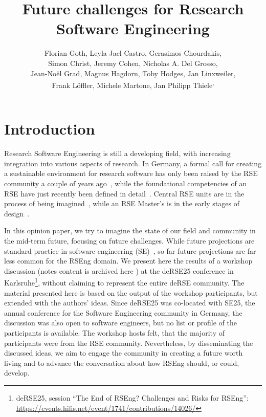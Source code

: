 \documentclass{eceasst}
\title{Future challenges for Research Software Engineering} %
\author{
Florian Goth\authorOrcid{0000-0003-2707-4790}\authorRef{1},
Leyla Jael Castro\authorOrcid{0000-0003-3986-0510}\authorRef{2},
Gerasimos Chourdakis\authorOrcid{0000-0002-3977-1385}\authorRef{3},
\texorpdfstring{\\}{} %
Simon Christ\authorOrcid{0000-0002-5866-1472}\authorRef{4},
Jeremy Cohen\authorOrcid{0000-0003-4312-2537}\authorRef{5},
Nicholas A. Del Grosso\thinspace\authorRef{6},
\texorpdfstring{\\}{} %
Jean-Noël Grad\authorOrcid{0000-0002-5821-4912}\authorRef{7},
Magnus Hagdorn\authorOrcid{0000-0002-5076-4864}\authorRef{8},
Toby Hodges\authorOrcid{0000-0003-1766-456X}\authorRef{9},
Jan Linxweiler\authorOrcid{0000-0002-2755-5087}\authorRef{10},
\texorpdfstring{\\}{} %
Frank Löffler\authorOrcid{0000-0001-6643-6323}\authorRef{11},
Michele Martone\authorOrcid{0000-0003-3239-8554}\authorRef{12},
Jan Philipp Thiele\authorOrcid{0000-0002-8901-6660}\authorRef{10}\textsuperscript{,}\authorRef{13}
} %
\institute{%
\autlabel{1} Institut für theoretische Physik 1, University of Würzburg, 97074, Würzburg, Germany\\
\autlabel{2} ZB MED Information Centre for Life Sciences, Cologne, Germany\\
\autlabel{3} Institute for Parallel and Distributed Systems, University of Stuttgart, Stuttgart, Germany\\
\autlabel{4} Leibniz University Hannover, Department of Cell Biology and Biophysics, Computational Biology, Germany\\
\autlabel{5} Imperial College London, London, UK\\
\autlabel{6} Institute for Experimental Epileptology and Cognition Research, Uniklinikum Bonn, Germany\\
\autlabel{7} Institute for Computational Physics, University of Stuttgart, Germany\\
\autlabel{8} Geschäftsbereich IT, Charité Universitätsmedizin Berlin, Germany\\
\autlabel{9} The Carpentries, USA\\
\autlabel{10} Technische Universität Braunschweig, Germany\\
\autlabel{11} Michael Stifel Center Jena {\&} Friedrich Schiller University Jena, Germany\\
\autlabel{12} Independent researcher, Germany\\
\autlabel{13} Weierstrass Institute, Berlin, Germany;
              Leibniz University Hannover, Institute of Applied Mathematics, Scientific Computing, Hannover, Germany\\
}
\begin{document}
\maketitle

\section{Introduction}

Research Software Engineering is still a developing field,
with increasing integration into various aspects of research.
In Germany, a formal call for creating a sustainable environment for research software has only been raised by the RSE community a couple of years ago~\cite{Anzt2021},
while the foundational competencies of an RSE have just recently been defined in detail~\cite{Goth2024}.
Central RSE units are in the process of being imagined~\cite{Kempf2025-draft},
while an RSE Master's is in the early stages of design~\cite{Dehne2025-draft}.

In this opinion paper, we try to imagine the state of our field
and community in the mid-term future, focusing on future challenges.
While future projections are standard practice in software engineering (SE)~\cite{Katz2023,Khan2021,Hu2023,Bosch2016a,Boehm2011},
so far future projections are far less common for the RSEng domain.
We present here the results of a workshop discussion (notes content is archived here \cite{goth2025_WSPad}) at the
deRSE25 conference in Karlsruhe\footnote{deRSE25, session ``The End of {RSEng}?
Challenges and Risks for {RSEng}'': \url{https://events.hifis.net/event/1741/contributions/14026/}},
without claiming to represent the entire deRSE community.
The material presented here is based on the output of the workshop participants, but extended with the authors' ideas.
Since deRSE25 was co-located with SE25, the annual conference for the Software Engineering community in Germany, the discussion was also open to software engineers,
but no list or profile of the participants is available.
The workshop hosts felt, that the majority of participants were from the RSE community.
Nevertheless, by disseminating the discussed ideas,
we aim to engage the community in creating a future worth living
and to advance the conversation about how RSEng should, or could, develop.
\end{document}
